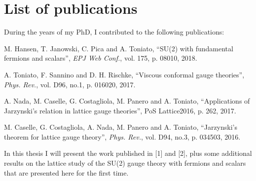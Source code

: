 
\chapter*{List of publications}


During the years of my PhD, I contributed to the following publications:


\begin{enumerate}[label={[\arabic*]}]
\item M. Hansen, T. Janowski, C. Pica and A. Toniato, ``SU(2) with fundamental fermions and scalars'', \emph{EPJ Web Conf.}, vol. 175, p. 08010, 2018.
\item  A. Toniato,  F. Sannino and D. H. Rischke, ``Viscous conformal gauge theories'', \emph{Phys. Rev.}, vol. D96, no.1, p. 016020, 2017.
\item  A. Nada,  M. Caselle, G. Costagliola, M. Panero and A. Toniato, ``Applications of Jarzynski's relation in lattice gauge theories'', PoS Lattice2016, p. 262, 2017.
 \item M. Caselle, G. Costagliola, A. Nada, M. Panero and A. Toniato, ``Jarzynski’s theorem for lattice gauge theory'', \emph{Phys. Rev.}, vol. D94, no.3, p. 034503, 2016.
\end{enumerate}


In this thesis I will present the work published in [1] and [2], plus some additional results on the lattice study of the SU(2) gauge theory with fermions and scalars that are presented here for the first time.